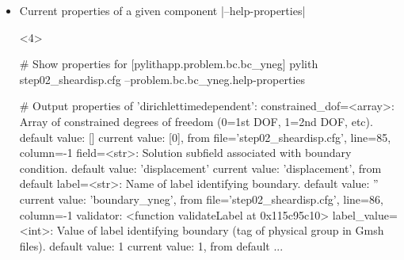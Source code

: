 \documentclass[aspectratio=169]{beamer}
\begin{document}
\begin{frame}[t,fragile]
\begin{itemize}
\begin{onlyenv}
\begin{pyrejournal}
        # Output
        facilities of 'dirichlettimedependent':
            auxiliary_subfields=<component name>: Discretization information for auxiliary subfields.
                current value: 'auxiliary_subfields', from {file='lib/python3.12/site-packages/pythia/pyre/inventory/ConfigurableClass.py', line=26, function='__set__'}
                configurable as: auxiliary_subfields
            db_auxiliary_field=<component name>: Database for physical property parameters.
                current value: 'simpledb', from {imported} via {file='step02_sheardisp.cfg', line=75, column=-1}
                configurable as: simpledb, db_auxiliary_field
            derived_subfields=<component name>: Discretization of derived subfields.
                current value: 'emptybin', from {default}
                configurable as: emptybin, derived_subfields
            ...
      \end{pyrejournal}
    \end{onlyenv}
  \item Current properties of a given component \bashinline|--help-properties|
    \begin{onlyenv}<4>
      \begin{pyrejournal}
        # Show properties for [pylithapp.problem.bc.bc_yneg]
        pylith step02_sheardisp.cfg --problem.bc.bc_yneg.help-properties

        # Output
        properties of 'dirichlettimedependent':
            constrained_dof=<array>: Array of constrained degrees of freedom (0=1st DOF, 1=2nd DOF, etc).
                default value: []
                current value: [0], from {file='step02_sheardisp.cfg', line=85, column=-1}
            field=<str>: Solution subfield associated with boundary condition.
                default value: 'displacement'
                current value: 'displacement', from {default}
            label=<str>: Name of label identifying boundary.
                default value: ''
                current value: 'boundary_yneg', from {file='step02_sheardisp.cfg', line=86, column=-1}
                validator: <function validateLabel at 0x115c95c10>
            label_value=<int>: Value of label identifying boundary (tag of physical group in Gmsh files).
                default value: 1
                current value: 1, from {default}
            ...
      \end{pyrejournal}
    \end{onlyenv}
  \end{itemize}

\end{frame}
\end{document}
